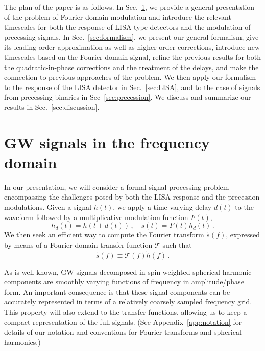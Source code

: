 \documentclass[aps,showpacs,twocolumn,
prd,superscriptaddress,nofootinbib]{revtex4-1}
\newcommand{\be}{\begin{equation}}
\newcommand{\ee}{\end{equation}}
\newcommand\calT{{\mathcal{T}}}
\begin{document}
The plan of the paper is as follows. In Sec.~\ref{sec:motivation}, we provide a general presentation of the problem of Fourier-domain modulation and introduce the relevant timescales for both the response of LISA-type detectors and the modulation of precessing signals. In Sec.~\ref{sec:formalism}, we present our general formalism, give its leading order approximation as well as higher-order corrections, introduce new timescales based on the Fourier-domain signal, refine the previous results for both the quadratic-in-phase corrections and the treatment of the delays, and make the connection to previous approaches of the problem. We then apply our formalism to the response of the LISA detector in Sec.~\ref{sec:LISA}, and to the case of signals from precessing binaries in Sec~\ref{sec:precession}. We discuss and summarize our results in Sec.~\ref{sec:discussion}.


\section{GW signals in the frequency domain}
\label{sec:motivation}



In our presentation, we will consider a formal signal processing problem encompassing the challenges posed by both the LISA response and the precession modulations. Given a signal $h(t)$, we apply a time-varying delay $d(t)$ to the waveform followed by a multiplicative modulation function $F(t)$,
\be
\label{eq:delay-mod-defs}
	h_{d}(t) = h(t+d(t)) \,, \quad s(t) = F(t)h_{d}(t) \,.
\ee
We then seek an efficient way to compute the Fourier transform $\tilde{s}(f)$, expressed by means of a Fourier-domain transfer function $\calT$ such that
\be\label{eq:deftransfer}
	\tilde{s}(f) \equiv \calT(f) \tilde{h}(f) \,. 
\ee

As is well known, GW signals decomposed in spin-weighted spherical harmonic components are smoothly varying functions of frequency in amplitude/phase form. An important consequence is that these signal components can be accurately represented in terms of a relatively coarsely sampled frequency grid. This property will also extend to the transfer functions, allowing us to keep a compact representation of the full signals. (See Appendix~\ref{app:notation} for details of our notation and conventions for Fourier transforms and spherical harmonics.)
\end{document}
